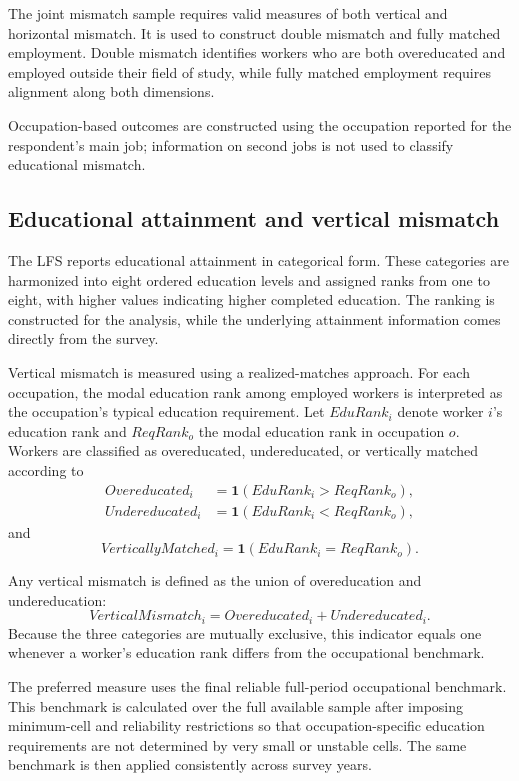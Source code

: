 The joint mismatch sample requires valid measures of both vertical and horizontal mismatch. It is used to construct double mismatch and fully matched employment. Double mismatch identifies workers who are both overeducated and employed outside their field of study, while fully matched employment requires alignment along both dimensions.

Occupation-based outcomes are constructed using the occupation reported for the respondent's main job; information on second jobs is not used to classify educational mismatch.

\subsection{Educational attainment and vertical mismatch}

The LFS reports educational attainment in categorical form. These categories are harmonized into eight ordered education levels and assigned ranks from one to eight, with higher values indicating higher completed education. The ranking is constructed for the analysis, while the underlying attainment information comes directly from the survey.

Vertical mismatch is measured using a realized-matches approach. For each occupation, the modal education rank among employed workers is interpreted as the occupation's typical education requirement. Let $EduRank_{i}$ denote worker $i$'s education rank and $ReqRank_{o}$ the modal education rank in occupation $o$. Workers are classified as overeducated, undereducated, or vertically matched according to
\begin{align*}
Overeducated_{i} &= \mathbf{1}\left( EduRank_{i} > ReqRank_{o} \right), \\
Undereducated_{i} &= \mathbf{1}\left( EduRank_{i} < ReqRank_{o} \right),
\end{align*}
and
\[
VerticallyMatched_{i} = \mathbf{1}\left( EduRank_{i} = ReqRank_{o} \right).
\]

Any vertical mismatch is defined as the union of overeducation and undereducation:
\[
VerticalMismatch_{i} = Overeducated_{i} + Undereducated_{i}.
\]
Because the three categories are mutually exclusive, this indicator equals one whenever a worker's education rank differs from the occupational benchmark.

The preferred measure uses the final reliable full-period occupational benchmark. This benchmark is calculated over the full available sample after imposing minimum-cell and reliability restrictions so that occupation-specific education requirements are not determined by very small or unstable cells. The same benchmark is then applied consistently across survey years.

